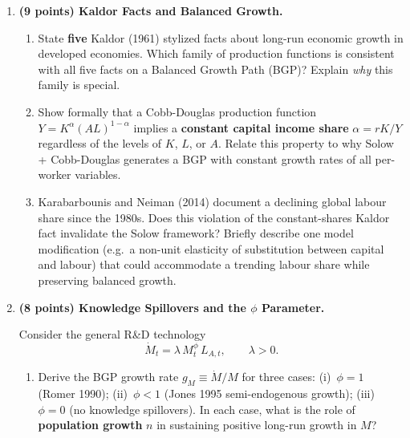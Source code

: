 \documentclass[a4paper,11pt]{article}
\begin{document}
\begin{enumerate}[label=\textbf{\arabic*.}, leftmargin=*, itemsep=14pt]

    \item \textbf{(9 points) Kaldor Facts and Balanced Growth.}

    \begin{enumerate}[label=(\alph*), itemsep=6pt]
        \item State \textbf{five} Kaldor (1961) stylized facts about long-run economic
        growth in developed economies.  Which family of production functions is consistent
        with all five facts on a Balanced Growth Path (BGP)?  Explain \emph{why} this
        family is special.

        \item Show formally that a Cobb-Douglas production function
        $Y = K^{\alpha}(AL)^{1-\alpha}$ implies a \textbf{constant capital income share}
        $\alpha = rK/Y$ regardless of the levels of $K$, $L$, or $A$.  Relate this
        property to why Solow + Cobb-Douglas generates a BGP with constant growth rates
        of all per-worker variables.

        \item Karabarbounis and Neiman (2014) document a declining global labour share
        since the 1980s.  Does this violation of the constant-shares Kaldor fact
        invalidate the Solow framework?  Briefly describe one model modification
        (e.g.\ a non-unit elasticity of substitution between capital and labour) that
        could accommodate a trending labour share while preserving balanced growth.
    \end{enumerate}

    \item \textbf{(8 points) Knowledge Spillovers and the $\phi$ Parameter.}

    Consider the general R\&D technology
    \[
        \dot{M}_t = \lambda\,M_t^{\phi}\,L_{A,t}, \qquad \lambda > 0.
    \]

    \begin{enumerate}[label=(\alph*), itemsep=6pt]
        \item Derive the BGP growth rate $g_M \equiv \dot{M}/M$ for three cases:
        (i)~$\phi = 1$ (Romer 1990); (ii)~$\phi < 1$ (Jones 1995 semi-endogenous growth);
        (iii)~$\phi = 0$ (no knowledge spillovers).
        In each case, what is the role of \textbf{population growth} $n$ in sustaining
        positive long-run growth in $M$?


\end{enumerate}
\end{enumerate}
\end{document}
